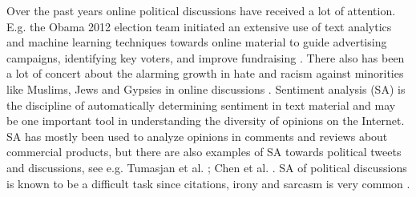 \documentclass[11pt]{article}
\begin{document}

Over the past years online political discussions have received a lot of attention. E.g. the Obama 2012 election team initiated an extensive use of text analytics and machine learning techniques towards online material to guide advertising campaigns, identifying key voters, and improve fundraising \cite{Issenberg12}. There also has been a lot of concert about the alarming growth in hate and racism against minorities like Muslims, Jews and Gypsies in online discussions \cite{r6,s2}. Sentiment analysis (SA) is the discipline of automatically determining sentiment in text material and may be one important tool in understanding the diversity of opinions on the Internet. SA has mostly been used to analyze opinions in comments and reviews about commercial products, but there are also examples of SA towards political tweets and discussions, see e.g. Tumasjan et al. ; Chen et al. . SA of political discussions is known to be a difficult task since citations, irony and sarcasm is very common \cite{Bing12}.

\end{document}
